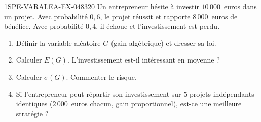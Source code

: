 \begin{exercice}{1SPE-VARALEA-EX-048}{3}{20}
Un entrepreneur hésite à investir $10\,000$~euros dans un projet. Avec probabilité $0{,}6$, le projet réussit et rapporte $8\,000$~euros de bénéfice. Avec probabilité $0{,}4$, il échoue et l'investissement est perdu.

\begin{enumerate}
  \item Définir la variable aléatoire $G$ (gain algébrique) et dresser sa loi.
  \item Calculer $E(G)$. L'investissement est-il intéressant en moyenne ?
  \item Calculer $\sigma(G)$. Commenter le risque.
  \item Si l'entrepreneur peut répartir son investissement sur $5$ projets indépendants identiques ($2\,000$~euros chacun, gain proportionnel), est-ce une meilleure stratégie ?
\end{enumerate}
\end{exercice}
